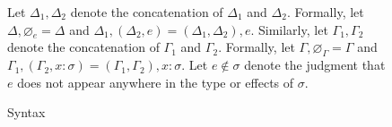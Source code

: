 \documentclass[12pt]{article}
\newcommand\parens[1]{\left( #1 \right)} %
\newcommand\evar{x}
\newcommand\tanno[2]{#1 : #2} %
\newcommand\tx{\sigma}
\newcommand\xeffect{e}
\newcommand\xeffects{\Delta}
\newcommand\xempty{\varnothing_{\xeffect}}
\newcommand\xextend[2]{#1, #2}
\newcommand\xunion[2]{#1, #2}
\newcommand\xnotint[2]{#1 \notin #2} %
\newcommand\ccontext{\Gamma}
\newcommand\cempty{\varnothing_{\ccontext}}
\newcommand\cextend[2]{#1, #2}
\newcommand\cunion[2]{#1, #2}
\begin{document}
\begin{figure}
\begin{mdframed}
      \bigskip

      Let $\xunion{\xeffects_1}{\xeffects_2}$ denote the concatenation of $\xeffects_1$ and $\xeffects_2$. Formally, let $\xunion{\xeffects}{\xempty} = \xeffects$ and $\xunion{\xeffects_1}{\parens{\xextend{\xeffects_2}{\xeffect}}} = \xextend{\parens{\xunion{\xeffects_1}{\xeffects_2}}}{\xeffect}$. Similarly, let $\cunion{\ccontext_1}{\ccontext_2}$ denote the concatenation of $\ccontext_1$ and $\ccontext_2$. Formally, let $\cunion{\ccontext}{\cempty} = \ccontext$ and $\cunion{\ccontext_1}{\parens{\cextend{\ccontext_2}{\tanno{\evar}{\tx}}}} = \cextend{\parens{\cunion{\ccontext_1}{\ccontext_2}}}{\tanno{\evar}{\tx}}$. Let $\xnotint{\xeffect}{\tx}$ denote the judgment that $\xeffect$ does not appear anywhere in the type or effects of $\tx$.

      \caption{Syntax}\label{fig:syntax}
    \end{mdframed}
  \end{figure}
\end{document}
